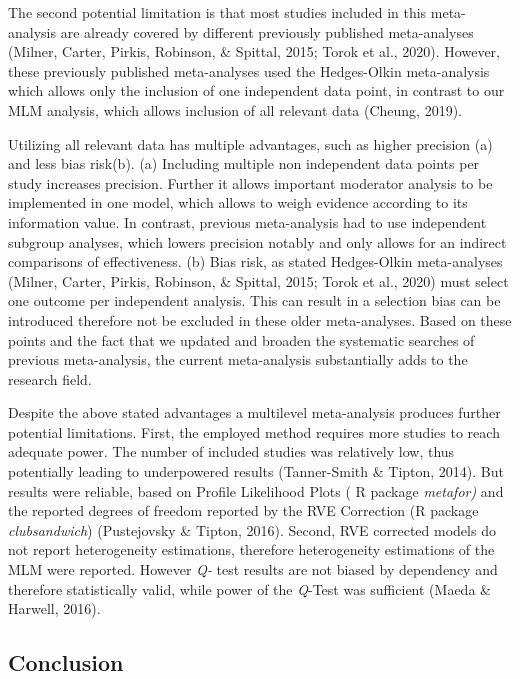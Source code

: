\documentclass[
  english,
  man]{apa6}
\begin{document}
The second potential limitation is that most studies included in this meta-analysis are already covered by different previously published meta-analyses (Milner, Carter, Pirkis, Robinson, \& Spittal, 2015; Torok et al., 2020). However, these previously published meta-analyses used the Hedges-Olkin meta-analysis which allows only the inclusion of one independent data point, in contrast to our MLM analysis, which allows inclusion of all relevant data (Cheung, 2019).

Utilizing all relevant data has multiple advantages, such as higher precision (a) and less bias risk(b). (a) Including multiple non independent data points per study increases precision. Further it allows important moderator analysis to be implemented in one model, which allows to weigh evidence according to its information value. In contrast, previous meta-analysis had to use independent subgroup analyses, which lowers precision notably and only allows for an indirect comparisons of effectiveness. (b) Bias risk, as stated Hedges-Olkin meta-analyses (Milner, Carter, Pirkis, Robinson, \& Spittal, 2015; Torok et al., 2020) must select one outcome per independent analysis. This can result in a selection bias can be introduced therefore not be excluded in these older meta-analyses. Based on these points and the fact that we updated and broaden the systematic searches of previous meta-analysis, the current meta-analysis substantially adds to the research field.

Despite the above stated advantages a multilevel meta-analysis produces further potential limitations. First, the employed method requires more studies to reach adequate power. The number of included studies was relatively low, thus potentially leading to underpowered results (Tanner-Smith \& Tipton, 2014). But results were reliable, based on Profile Likelihood Plots ( R package \emph{metafor)} and the reported degrees of freedom reported by the RVE Correction (R package \emph{clubsandwich}) (Pustejovsky \& Tipton, 2016). Second, RVE corrected models do not report heterogeneity estimations, therefore heterogeneity estimations of the MLM were reported. However \emph{Q-} test results are not biased by dependency and therefore statistically valid, while power of the \emph{Q}-Test was sufficient (Maeda \& Harwell, 2016).

\hypertarget{conclusion}{%
\subsection{Conclusion}\label{conclusion}}
\end{document}
